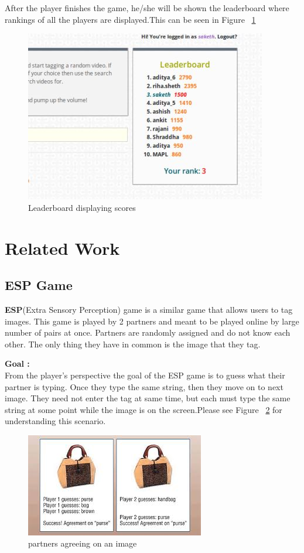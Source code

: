 \documentclass[12pt]{article}
\begin{document}
\newpage
After the player finishes the game, he/she will be shown the leaderboard where rankings of all the players are displayed.This can be seen in Figure ~\ref{leaderboard}

\begin{figure}[h]
\begin{center}
\includegraphics{images/leaderboard.jpg}
\caption{Leaderboard displaying scores}
\label{leaderboard}
\end{center}
\end{figure}


\newpage
\section{Related Work}
\subsection{ESP Game\cite{esp}}
\textbf{ESP}(Extra Sensory Perception) game is a similar game that allows users to tag images. This game is played by 2 partners and meant to be played online by large number of pairs at once. Partners are randomly assigned and do not know each other. The only thing they have in common is the image that they tag. 

\textbf{Goal :}\\
From the player's perspective the goal of the ESP game is to guess what their partner is typing. Once they type the same string, then they move on to next image. They need not enter the tag at same time, but each must type the same string at some point while the image is on the screen.Please see Figure ~\ref{agree on image} for understanding this scenario. \\

\begin{figure}[h]
\begin{center}
\includegraphics{images/esp_handbag.jpeg}
\caption{partners agreeing on an image}
\label{agree on image}
\end{center}
\end{figure}
\end{document}
